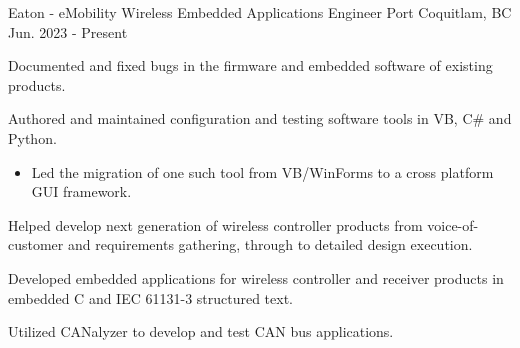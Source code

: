 


\begin{cventries}
    \cventry
    {Eaton - eMobility Wireless} %
    {Embedded Applications Engineer} %
    {Port Coquitlam, BC} %
    {Jun. 2023 - Present} %
    { %
        \begin{cvitems}
            \item {Documented and fixed bugs in the firmware and embedded software of existing products.}
            \item {Authored and maintained configuration and testing software tools in VB, C\# and Python.}
            \begin{itemize}
                \item {Led the migration of one such tool from VB/WinForms to a cross platform GUI framework.}
            \end{itemize}
            \item {Helped develop next generation of wireless controller products from voice-of-customer and requirements gathering, through to detailed design execution.}
            \item {Developed embedded applications for wireless controller and receiver products in embedded C and IEC 61131-3 structured text.}
            \item {Utilized CANalyzer to develop and test CAN bus applications. }
        \end{cvitems}
    }


\end{cventries}
